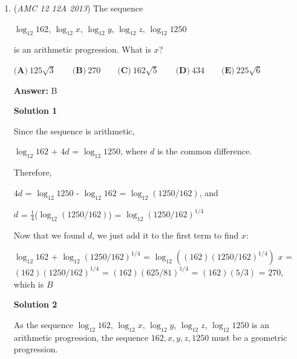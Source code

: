 \begin{enumerate}
\textbf{Solution 2 (Shoelace)}

Let the point of intersection be $E$, with coordinates $(x, y)$. Then, $ABCD$ is cut into $ABCE$ and $AED$. 

 Since the areas are equal, we can use \href{https://artofproblemsolving.com/wiki/index.php?title=Shoelace\_Theorem}{Shoelace Theorem} to find the area. This gives $3 + 3x - 3y = 4y$.

 The line going through $CD$ is $y = -3x + 12$. Since $E$ is on $CD$, we can substitute this in, giving $3 + 3x = -21x + 84$. Solving for $x$ gives $\frac{27}{8}$. Plugging this back into the line equation gives $y = \frac{15}{8}$, for a final answer of $\boxed{58}$.

 


	\item (\textit{AMC 12 12A 2013}) The sequence


 $\log_{12}{162}$, $\log_{12}{x}$, $\log_{12}{y}$, $\log_{12}{z}$, $\log_{12}{1250}$


 is an arithmetic progression. What is $x$?


 $\textbf{(A)} \ 125\sqrt{3} \qquad \textbf{(B)} \ 270 \qquad \textbf{(C)} \ 162\sqrt{5} \qquad \textbf{(D)} \ 434 \qquad \textbf{(E)} \ 225\sqrt{6}$

 \textbf{Answer: }B



\textbf{Solution 1}

Since the sequence is arithmetic, 

 $\log_{12}{162}$ + $4d$ = $\log_{12}{1250}$, where $d$ is the common difference.

 
Therefore,

 $4d$ = $\log_{12}{1250}$ - $\log_{12}{162}$ = $\log_{12}{(1250/162)}$, and

 $d$ = $\frac{1}{4}$($\log_{12}{(1250/162)}$) = $\log_{12}{(1250/162)^{1/4}}$

 


 Now that we found $d$, we just add it to the first term to find $x$:

 $\log_{12}{162}$ + $\log_{12}{(1250/162)^{1/4}}$ = $\log_{12}{((162)(1250/162)^{1/4})}$
$x$ = $(162)$$(1250/162)^{1/4}$ = $(162)$$(625/81)^{1/4}$ = $(162)(5/3)$ = $270$, which is $\boxed{B}$




\textbf{Solution 2}

As the sequence $\log_{12}{162}$, $\log_{12}{x}$, $\log_{12}{y}$, $\log_{12}{z}$, $\log_{12}{1250}$ is an arithmetic progression, the sequence $162,x,y,z,1250$ must be a geometric progression.


\end{enumerate}
